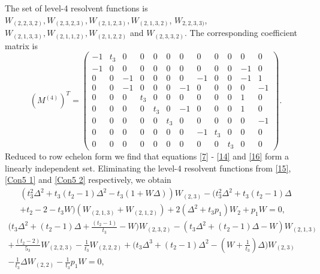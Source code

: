 The set of level-4 resolvent functions is $W_{(2,2,3,2)}, W_{(2,3,2,3)}, W_{(2,1,2,3)},
    W_{(2,1,3,2)}$, $ W_{2,2,3,3)}$, $W_{(2,1,3,3)}, W_{(2,1,1,2)}, W_{(2,1,2,2)}$ and $W_{(2,3,3,2)}$.
The corresponding coefficient matrix is
%
\begin{equation}
    (M^{(4)})^T =
    \begin{pmatrix}
        -1 & t_3 & 0  & 0   & 0   & 0   & 0  & 0   & 0   & 0   & 0  & 0 \\
        -1 & 0   & 0  & 0   & 0   & 0   & 0  & 0   & 0   & 0   & -1 & 0 \\
        0  & 0   & -1 & 0   & 0   & 0   & 0  & -1  & 0   & 0   & -1 & 1 \\
        0  & 0   & -1 & 0   & 0   & 0   & -1 & 0   & 0   & 0   & 0  & -1 \\
        0  & 0   & 0  & t_3 & 0   & 0   & 0  & 0   & 0   & 0   & 1  & 0 \\
        0  & 0   & 0  & 0   & t_3 & 0   & -1 & 0   & 0   & 0   & 1  & 0 \\
        0  & 0   & 0  & 0   & 0   & t_3 & 0  & 0   & 0   & 0   & 0  & -1 \\
        0  & 0   & 0  & 0   & 0   & 0   & 0  & - 1 & t_3 & 0   & 0  & 0 \\
        0  & 0   & 0  & 0   & 0   & 0   & 0  & 0   & 0   & t_3 & 0  & 0
    \end{pmatrix}.
\end{equation}
%
Reduced to row echelon form we find that equations \eqref{7} - \eqref{14} and \eqref{16} form a
linearly independent set. Eliminating the level-4 resolvent functions from \eqref{15}, \eqref{Con5
    1} and \eqref{Con5 2} respectively, we obtain
%
\begin{multline}
    \label{Con4 1}
    (t_3^2 \Delta^2 + t_3(t_2-1)\Delta^2 - t_3(1+W\Delta))W_{(2,3)} -  (t_3^2 \Delta^2 + t_3(t_2-1)\Delta \\
    + t_2 - 2 - t_3 W)(W_{(2,1,3)} + W_{(2,1,2)}) + 2(\Delta^2 + t_3 p_{1}) W_{2} + p_{1} W = 0 ,
\end{multline}
%
\begin{multline}
    \label{Con4 2}
    \bigg(t_3 \Delta^2 + (t_2 -1) \Delta + \frac{(t_2 -1)}{t_3} -W\bigg) W_{(2,3,2)} - (t_3 \Delta^2 + (t_2 -1)\Delta - W)W_{(2,1,3)} \\
    + \frac{(t_2-2)}{5_3} W_{(2,2,3)} - \frac{1}{t_3} W_{(2,2,2)} + \bigg(t_3 \Delta^3 + (t_2-1)\Delta^2 - \left(W+\frac{1}{t_3}\right)\Delta\bigg)W_{(2,3)} \\
    - \frac{1}{t_3}\Delta W_{(2,2)} - \frac{1}{t_3} p_1 W = 0,
\end{multline}
